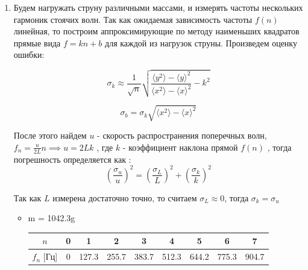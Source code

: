 \documentclass[8pt]{article}
\begin{document}
    \begin{enumerate}
    \item 
         Будем нагружать струну различными массами, и измерять частоты нескольких гармоник стоячих волн.
    Так как ожидаемая зависимость частоты $f\left(n\right)$ линейная, то построим аппроксимирующие по методу наименьших квадратов прямые вида $f = kn + b$ для каждой из нагрузок струны.
    Произведем оценку ошибки:

    \begin{equation}
            \sigma_{k} \approx \frac{1}{\sqrt{n}}
                \sqrt{\frac{\langle y^2 \rangle -  \langle y \rangle ^2}
                        {\langle x^2 \rangle - \langle x \rangle ^2} 
                    - k^2} 
    \end{equation}

    \begin{equation}
            \sigma_{b} = \sigma_{k} \sqrt{\langle x^2 \rangle - \langle x \rangle ^2} 
    \end{equation}

    После этого найдем $u$ - скорость распространения поперечных волн, 
    $f_n = \frac{u}{2L} n \implies u = 2Lk$ , где $k$ - коэффициент наклона прямой $f(n)$ , 
    тогда погрешность определяется как : 
    \begin{equation}
        \left(\frac{\sigma_u}{u} \right)^2 = \left(\frac{\sigma_L}{L}\right)^2 + \left(\frac{\sigma_k}{k}\right)^2
    \end{equation}

    Так как $L$ измерена достаточно точно, то считаем $\sigma_L \approx 0$, тогда $\sigma_k = \sigma_u$
    
    \begin{itemize}
        \item m = 1042.3g
                    \begin{center}
                    \begin{tabular}{|c|c|c|c|c|c|c|c|c|}
                            \hline 
                                $n$ & 0 & 1 & 2 & 3 & 4 & 5 & 6 & 7 \\
                            \hline
                                $f_n$ [Гц] &0&127.3&255.7&383.7&512.3&644.2&775.3&904.7\\
                            \hline
                    \end{tabular}
                    \end{center}


\end{itemize}
\end{enumerate}
\end{document}
